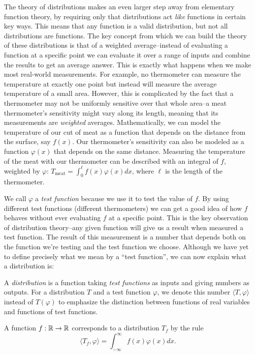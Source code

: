   The theory of distributions makes an even larger step away from elementary function theory, by requiring only that distributions act \emph{like} functions in certain key ways.
  This means that any function is a valid distribution, but not all distributions are functions.
  The key concept from which we can build the theory of these distributions is that of a weighted average--instead of evaluating a function at a specific point we can evaluate it over a range of inputs and combine the results to get an average answer.
  This is exactly what happens when we make most real-world measurements.
  For example, no thermometer can measure the temperature at exactly one point but instead will measure the average temperature of a small area.
  However, this is complicated by the fact that a thermometer may not be uniformly sensitive over that whole area--a meat thermometer's sensitivity might vary along its length, meaning that its measurements are \emph{weighted} averages. 
  Mathematically, we can model the temperature of our cut of meat as a function that depends on the distance from the surface, say $f(x)$.
  Our thermometer's sensitivity can also be modeled as a function $\varphi(x)$ that depends on the same distance.
  Measuring the temperature of the meat with our thermometer can be described with an integral of $f$, weighted by $\varphi$: $T_\text{meat} = \int_0^\ell f(x)\varphi(x) dx$, where $\ell$ is the length of the thermometer. %

  We call $\varphi$ a \emph{test function} because we use it to test the value of $f$.
  By using different test functions (different thermometers) we can get a good idea of how $f$ behaves without ever evaluating $f$ at a specific point.
  This is the key observation of distribution theory--any given function will give us a result when measured a test function.
  The result of this measurement is a number that depends both on the function we're testing and the test function we choose.
  Although we have yet to define precisely what we mean by a ``test function'', we can now explain what a distribution is:

  \begin{defn}[Distribution]
    A \emph{distribution} is a function taking \emph{test functions} as inputs and giving numbers as outputs.
    For a distribution $T$ and a test function $\varphi$, we denote this number $\langle T, \varphi \rangle$ instead of $T(\varphi)$ to emphasize the distinction between functions of real variables and functions of test functions.

    A function $f:\mathbb{R}\rightarrow\mathbb{R}$ corresponds to a distribution $T_f$ by the rule
    \begin{equation*}
      \langle T_f, \varphi \rangle = \int_{-\infty}^{\infty} f(x)\varphi(x)dx \text{.}
    \end{equation*}

  \end{defn}

